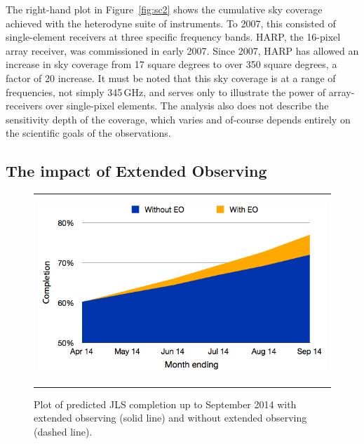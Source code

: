 \documentclass[]{spie}  %
\begin{document}
The right-hand plot in Figure~\ref{fig:sc2} shows the cumulative sky coverage achieved with
the heterodyne suite of instruments. To 2007, this consisted of
single-element receivers at three specific frequency bands. HARP, the
16-pixel array receiver, was commissioned in early 2007. Since 2007,
HARP has allowed an increase in sky coverage from 17 square degrees to
over 350 square degrees, a factor of 20 increase. It must be noted
that this sky coverage is at a range of frequencies, not simply
345\,GHz, and serves only to illustrate the power of array-receivers
over single-pixel elements. The analysis also does not describe the
sensitivity depth of the coverage, which varies and of-course depends
entirely on the scientific goals of the observations.


\subsection{The impact of Extended Observing}\label{sec:eo}
\begin{figure}[ht]
   \begin{center}
   \begin{tabular}{c}
   \includegraphics[height=7cm]{JLSspie2}
   \end{tabular}
   \end{center}
   \caption{\label{fig:eo} Plot of predicted JLS completion up to September 2014 with extended observing (solid line) and without extended observing (dashed line).}
\end{figure}
\end{document}
